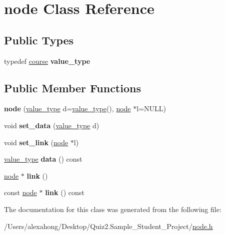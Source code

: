 \hypertarget{classnode}{}\section{node Class Reference}
\label{classnode}
\subsection*{Public Types}
\begin{DoxyCompactItemize}
\item 
\mbox{\label{classnode_af79958a8234d1a3d642adf6637cb9f9b}} 
typedef \hyperlink{classcourse}{course} {\bfseries value\+\_\+type}
\end{DoxyCompactItemize}
\subsection*{Public Member Functions}
\begin{DoxyCompactItemize}
\item 
\mbox{\label{classnode_a4d89d50fbee6842a2588ef0c07063cb8}} 
{\bfseries node} (\hyperlink{classcourse}{value\+\_\+type} d=\hyperlink{classcourse}{value\+\_\+type}(), \hyperlink{classnode}{node} $\ast$l=N\+U\+LL)
\item 
\mbox{\label{classnode_ac9906af97ebcd35ffa46145f865eed6c}} 
void {\bfseries set\+\_\+data} (\hyperlink{classcourse}{value\+\_\+type} d)
\item 
\mbox{\label{classnode_ae9887204ac73c954e3a4da3fa15c9df9}} 
void {\bfseries set\+\_\+link} (\hyperlink{classnode}{node} $\ast$l)
\item 
\mbox{\label{classnode_aa608d1caf66b840edfa523ee7825c995}} 
\hyperlink{classcourse}{value\+\_\+type} {\bfseries data} () const
\item 
\mbox{\label{classnode_a3871737751cf0fd295a07c77d0c72f82}} 
\hyperlink{classnode}{node} $\ast$ {\bfseries link} ()
\item 
\mbox{\label{classnode_a1cdde999247cd38cf9dc9ee8fc91f5f7}} 
const \hyperlink{classnode}{node} $\ast$ {\bfseries link} () const
\end{DoxyCompactItemize}


The documentation for this class was generated from the following file\+:\begin{DoxyCompactItemize}
\item 
/\+Users/alexahong/\+Desktop/\+Quiz2.\+Sample\+\_\+\+Student\+\_\+\+Project/\hyperlink{node_8h}{node.\+h}\end{DoxyCompactItemize}

